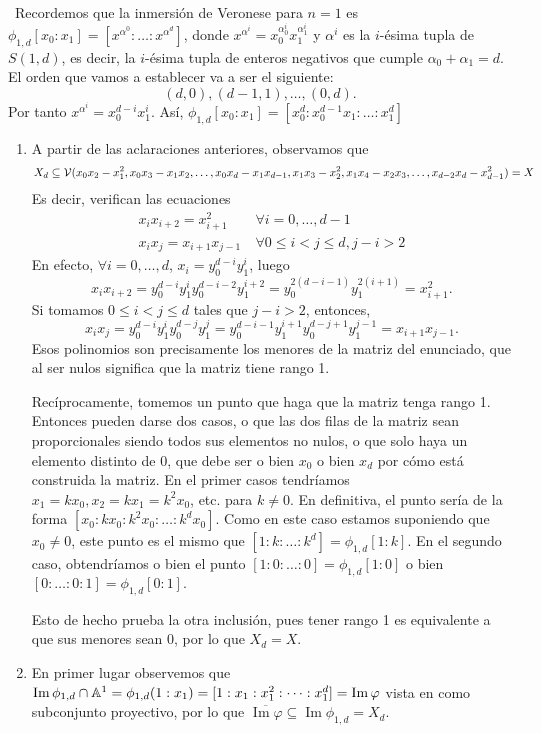 \documentclass[twoside]{article}
\DeclareMathOperator{\Ima}{Im}
\begin{document}
\begin{solucion}\
Recordemos que la inmersión de Veronese para $n=1$ es $\phi_{1,d}[x_0:x_1]=[x^{\alpha^0}:\dots:x^{\alpha^d}]$, donde $x^{\alpha^i}=x_0^{\alpha^i_0}x_1^{\alpha^i_1}$ y $\alpha^i$ es la $i$-ésima tupla de $S(1,d)$, es decir, la $i$-ésima tupla de enteros negativos que cumple $\alpha_0+\alpha_1=d$. El orden que vamos a establecer va a ser el siguiente: $$(d,0),(d-1,1),\dots, (0,d).$$
Por tanto $x^{\alpha^i}=x_0^{d-i}x_1^i$. Así, $\phi_{1,d}[x_0:x_1]=[x_0^d:x_0^{d-1}x_1:\dots:x_1^d]$
\begin{enumerate}
\item A partir de las aclaraciones anteriores, observamos que $$X_d\subseteq\mathcal{V}(x_0x_2-x_1^2,x_0x_3-x_1x_2,\dots, x_0x_d-x_1x_{d-1},x_1x_3-x_2^2,x_1x_4-x_2x_3,\dots, x_{d-2}x_d-x_{d-1}^2)=X$$
Es decir, verifican las ecuaciones
\begin{align*}
x_ix_{i+2}=x_{i+1}^2\ &\forall i=0,\dots,d-1\\
x_ix_j=x_{i+1}x_{j-1}\ &\forall 0\leq i< j\leq d, j-i>2
\end{align*}
En efecto, $\forall i=0,\dots,d$, $x_i=y_0^{d-i}y_1^i$, luego $$x_ix_{i+2}=y_0^{d-i}y_1^iy_0^{d-i-2}y_1^{i+2}=y_0^{2(d-i-1)}y_1^{2(i+1)}=x_{i+1}^2.$$ Si tomamos $0\leq i<j\leq d$ tales que $j-i>2$, entonces, $$x_ix_{j}=y_0^{d-i}y_1^iy_0^{d-j}y_1^{j}=y_0^{d-i-1}y_1^{i+1}y_0^{d-j+1}y_1^{j-1}=x_{i+1}x_{j-1}.$$
Esos polinomios son precisamente los menores de la matriz del enunciado, que al ser nulos significa que la matriz tiene rango 1.

Recíprocamente, tomemos un punto que haga que la matriz tenga rango 1. Entonces pueden darse dos casos, o que las dos filas de la matriz sean proporcionales siendo todos sus elementos no nulos, o que solo haya un elemento distinto de 0, que debe ser o bien $x_0$ o bien $x_d$ por cómo está construida la matriz. En el primer casos tendríamos $x_1=kx_0, x_2=kx_1=k^2x_0$, etc. para $k\neq 0$. En definitiva, el punto sería de la forma $[x_0:kx_0:k^2x_0:\dots:k^dx_0]$. Como en este caso estamos suponiendo que $x_0\neq 0$, este punto es el mismo que $[1:k:\dots:k^d]=\phi_{1,d}[1:k]$. En el segundo caso, obtendríamos o bien el punto $[1:0:\dots:0]=\phi_{1,d}[1:0]$ o bien $[0:\dots:0:1]=\phi_{1,d}[0:1].$

Esto de hecho prueba la otra inclusión, pues tener rango 1 es equivalente a que sus menores sean 0, por lo que $X_d=X$.

\item En primer lugar observemos que $\Ima{\phi_{1,d}}\cap\A^1=\phi_{1,d}(1:x_1)=[1:x_1:x_1^2:\dots:x_1^d]=\Ima{\varphi}$ vista en como subconjunto proyectivo, por lo que $\overline{\Ima{\varphi}}\subseteq \Ima{\phi_{1,d}}=X_d$. 


\end{enumerate}
\end{solucion}
\end{document}
